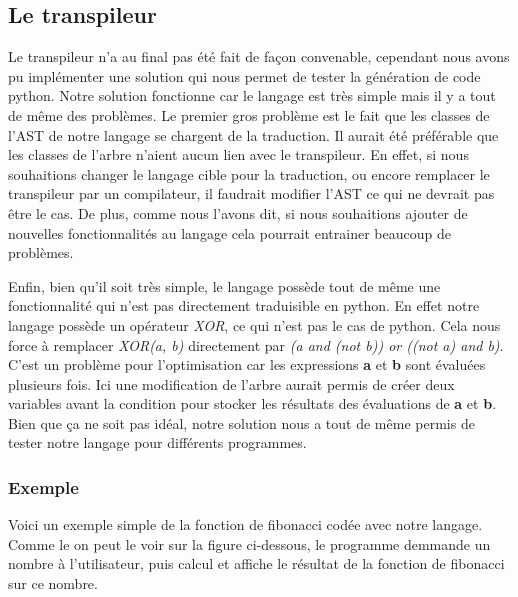 \documentclass[a4paper]{article}%
\begin{document}
\subsection{Le transpileur}

Le transpileur n'a au final pas été fait de façon convenable, cependant nous
avons pu implémenter une solution qui nous permet de tester la génération de
code python. Notre solution fonctionne car le langage est très simple mais il y
a tout de même des problèmes. Le premier gros problème est le fait que les
classes de l'AST de notre langage se chargent de la traduction. Il aurait été
préférable que les classes de l'arbre n'aient aucun lien avec le transpileur. En
effet, si nous souhaitions changer le langage cible pour la traduction, ou
encore remplacer le transpileur par un compilateur, il faudrait modifier l'AST
ce qui ne devrait pas être le cas. De plus, comme nous l'avons dit, si nous
souhaitions ajouter de nouvelles fonctionnalités au langage cela pourrait
entrainer beaucoup de problèmes.

Enfin, bien qu'il soit très simple, le langage possède tout de même une
fonctionnalité qui n'est pas directement traduisible en python. En effet notre
langage possède un opérateur \textit{XOR}, ce qui n'est pas le cas de python.
Cela nous force à remplacer \textit{XOR(a, b)} directement par \textit{(a and
(not b)) or ((not a) and b)}. C'est un problème pour l'optimisation car les
expressions \textbf{a} et \textbf{b} sont évaluées plusieurs fois. Ici une
modification de l'arbre aurait permis de créer deux variables avant la condition
pour stocker les résultats des évaluations de \textbf{a} et \textbf{b}.\\

Bien que ça ne soit pas idéal, notre solution nous a tout de même permis de
tester notre langage pour différents programmes.\\

\clearpage
\subsubsection*{Exemple}

Voici un exemple simple de la fonction de fibonacci codée avec notre langage.
Comme le on peut le voir sur la figure ci-dessous, le programme demmande un
nombre à l'utilisateur, puis calcul et affiche le résultat de la fonction de
fibonacci sur ce nombre.
\end{document}
